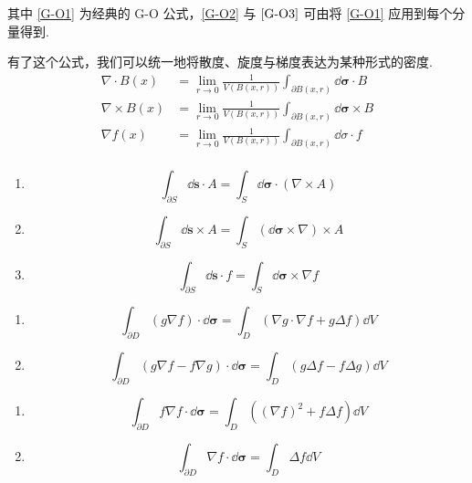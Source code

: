 其中 \ref{G-O1} 为经典的 G-O 公式，\ref{G-O2} 与 $\ref{G-O3}$ 可由将 \ref{G-O1} 应用到每个分量得到.

有了这个公式，我们可以统一地将散度、旋度与梯度表达为某种形式的密度.
$$
\begin{aligned}
    \nabla\cdot B(x)&=\lim_{r\to 0}\frac{1}{V(B(x,r))}\int_{\partial B(x,r)}\dd\bm{\sigma}\cdot B\\
    \nabla\times B(x)&=\lim_{r\to 0}\frac{1}{V(B(x,r))}\int_{\partial B(x,r)}\dd\bm{\sigma}\times B\\
    \nabla f(x)&=\lim_{r\to 0}\frac{1}{V(B(x,r))}\int_{\partial B(x,r)}\dd\sigma\cdot f\\
\end{aligned}
$$


\begin{property}
    \begin{enumerate}
        \item 
$$
\int_{\partial S}\dd\bm{s}\cdot A=\int_S\dd\bm{\sigma}\cdot(\nabla\times A)
$$

        \item 
$$
\int_{\partial S}\dd\bm{s}\times A=\int_S(\dd\bm{\sigma}\times \nabla)\times A
$$

        \item 
$$
\int_{\partial S}\dd\bm{s}\cdot f=\int_S\dd\bm{\sigma}\times\nabla f
$$
    \end{enumerate}
\end{property}


\begin{property}
    \begin{enumerate}
        \item 
$$
\int_{\partial D}(g\nabla f)\cdot\dd\bm{\sigma}=\int_D(\nabla g\cdot\nabla f+g\Delta f)\dd V
$$

        \item 
$$
\int_{\partial D}(g\nabla f-f\nabla g)\cdot\dd\bm{\sigma}=\int_D(g\Delta f-f\Delta g)\dd V
$$
    \end{enumerate}
\end{property}

\begin{inference}
    \begin{enumerate}
        \item 
$$
\int_{\partial D}f\nabla f\cdot\dd\bm{\sigma}=\int_D((\nabla f)^2+f\Delta f)\dd V
$$

        \item 
$$
\int_{\partial D}\nabla f\cdot\dd\bm{\sigma}=\int_D\Delta f\dd V
$$
    \end{enumerate}
\end{inference}